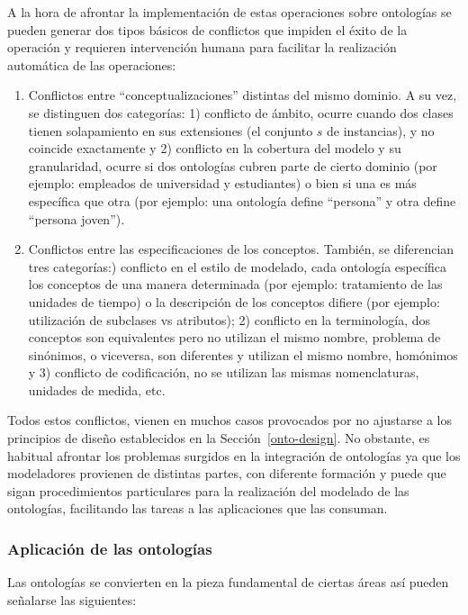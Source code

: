 A la hora de afrontar la implementación de estas operaciones sobre ontologías se pueden generar dos tipos básicos de conflictos que impiden el éxito de la
operación y requieren intervención humana para facilitar la realización
automática de las operaciones: 
\begin{enumerate}
  \item Conflictos entre ``conceptualizaciones'' distintas del mismo dominio. A
  su vez, se distinguen dos categorías: 1) conflicto de ámbito, ocurre cuando dos clases tienen solapamiento en sus extensiones (el
  conjunto $s$ de instancias), y no coincide exactamente y 2) conflicto en la
  cobertura del modelo y su granularidad, ocurre si dos ontologías cubren parte
  de cierto dominio (por ejemplo: empleados de universidad y estudiantes) o bien
si una es más específica que otra (por ejemplo: una ontología define ``persona'' y otra define ``persona joven'').
  \item Conflictos entre las especificaciones de los conceptos. También, se diferencian tres categorías:) conflicto en el estilo de
  modelado, cada ontología específica los conceptos de una manera determinada
(por ejemplo: tratamiento de las unidades de tiempo) o la descripción de los
conceptos   difiere (por ejemplo: utilización de subclases vs atributos); 2) conflicto
en la  terminología, dos conceptos son equivalentes pero no utilizan el mismo nombre,
  problema de sinónimos, o viceversa, son diferentes y utilizan el mismo nombre,
  homónimos y 3) conflicto de codificación, no se utilizan las mismas
  nomenclaturas, unidades de medida, etc.
\end{enumerate}

Todos estos conflictos, vienen en muchos casos provocados por no ajustarse a los
principios de diseño establecidos en la Sección~\ref{onto-design}. No
obstante, es habitual afrontar los problemas surgidos en la integración de ontologías ya que los
modeladores provienen de distintas partes, con diferente formación y puede que
sigan procedimientos particulares para la realización del modelado de
las ontologías, facilitando las tareas a las aplicaciones que las consuman.


\subsubsection{Aplicación de las ontologías}
Las ontologías se convierten en la pieza fundamental de ciertas áreas así pueden señalarse las 
siguientes:

